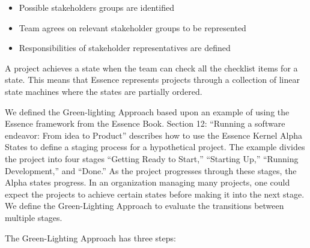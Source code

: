 \documentclass[conference]{IEEEtran}
\begin{document}
\begin{itemize}
\itemsep1pt\parskip0pt
\item
  Possible stakeholders groups are identified
\item
  Team agrees on relevant stakeholder groups to be represented
\item
  Responsibilities of stakeholder representatives are defined
\end{itemize}

A project achieves a state when the team can check all the checklist
items for a state. This means that Essence represents projects through a
collection of linear state machines where the states are partially
ordered.

We defined the Green-lighting Approach based upon an example of using
the Essence framework from the Essence Book. Section 12: ``Running a
software endeavor: From idea to Product''
\cite{EssenceBook} describes how to use the Essence
Kernel Alpha States to define a staging process for a hypothetical
project. The example divides the project into four stages ``Getting
Ready to Start,'' ``Starting Up,'' ``Running Development,'' and
``Done.'' As the project progresses through these stages, the Alpha
states progress. In an organization managing many projects, one could
expect the projects to achieve certain states before making it into the
next stage. We define the Green-Lighting Approach to evaluate the
transitions between multiple stages.

The Green-Lighting Approach has three steps:
\end{document}
